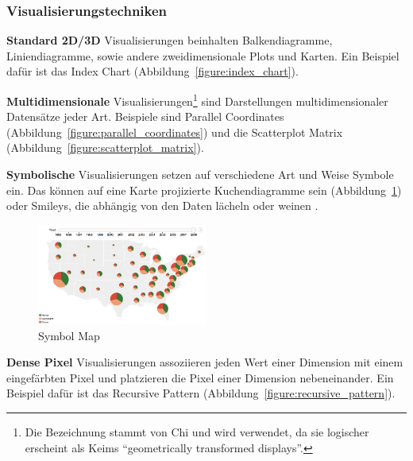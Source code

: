 \documentclass[
	headsepline,
	footsepline,
	fontsize=12pt,
	bibliography=totoc
]{scrbook}
\begin{document}

\subsubsection{Visualisierungstechniken}
\label{section:standderforschung:grundlagen:informationsvisualisierung:visualisierungstechniken}


\textbf{Standard 2D/3D} Visualisierungen beinhalten Balkendiagramme, Liniendiagramme, sowie andere zweidimensionale Plots und Karten. Ein Beispiel dafür ist das Index Chart (Abbildung~\ref{figure:index_chart}).

\textbf{Multidimensionale} Visualisierungen\footnote{Die Bezeichnung stammt von Chi \cite{Chi2000} und wird verwendet, da sie logischer erscheint als Keims \enquote{geometrically transformed displays}.} sind Darstellungen multidimensionaler Datensätze jeder Art. Beispiele sind Parallel Coordinates (Abbildung~\ref{figure:parallel_coordinates}) und die Scatterplot Matrix (Abbildung~\ref{figure:scatterplot_matrix}).


\textbf{Symbolische} Visualisierungen setzen auf verschiedene Art und Weise Symbole ein. Das können auf eine Karte projizierte Kuchendiagramme sein (Abbildung~\ref{figure:symbol_map}) oder Smileys, die abhängig von den Daten lächeln oder weinen \cite{Chernoff1973}.

\begin{figure}[htbp]
   \centering
   \includegraphics[width=0.5\textwidth]{images/grundlagen-symbol_map.png}
   \caption{Symbol Map}
   \label{figure:symbol_map}
\end{figure}


\textbf{Dense Pixel} Visualisierungen assoziieren jeden Wert einer Dimension mit einem eingefärbten Pixel und platzieren die Pixel einer Dimension nebeneinander. Ein Beispiel dafür ist das Recursive Pattern \cite{Keim1995} (Abbildung~\ref{figure:recursive_pattern}).
\end{document}
